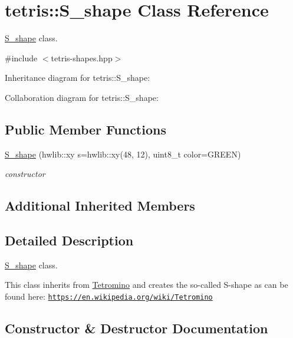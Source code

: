 \hypertarget{classtetris_1_1S__shape}{}\section{tetris\+:\+:S\+\_\+shape Class Reference}
\label{classtetris_1_1S__shape}


\hyperlink{classtetris_1_1S__shape}{S\+\_\+shape} class.  




{\ttfamily \#include $<$tetris-\/shapes.\+hpp$>$}



Inheritance diagram for tetris\+:\+:S\+\_\+shape\+:


Collaboration diagram for tetris\+:\+:S\+\_\+shape\+:
\subsection*{Public Member Functions}
\begin{DoxyCompactItemize}
\item 
\hyperlink{classtetris_1_1S__shape_a4910302c93e68f459c16c96152da5806}{S\+\_\+shape} (hwlib\+::xy s=hwlib\+::xy(48, 12), uint8\+\_\+t color=G\+R\+E\+EN)
\begin{DoxyCompactList}\small\item\em constructor \end{DoxyCompactList}\end{DoxyCompactItemize}
\subsection*{Additional Inherited Members}


\subsection{Detailed Description}
\hyperlink{classtetris_1_1S__shape}{S\+\_\+shape} class. 

This class inherits from \hyperlink{classtetris_1_1Tetromino}{Tetromino} and creates the so-\/called S-\/shape as can be found here\+: \href{https://en.wikipedia.org/wiki/Tetromino}{\tt https\+://en.\+wikipedia.\+org/wiki/\+Tetromino} 

\subsection{Constructor \& Destructor Documentation}
\mbox{\label{classtetris_1_1S__shape_a4910302c93e68f459c16c96152da5806}} 
